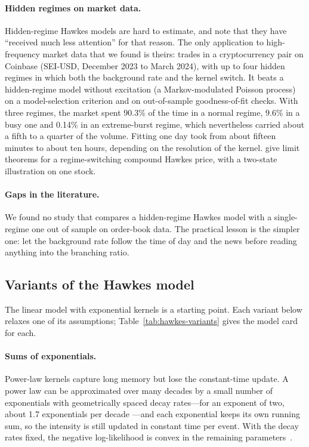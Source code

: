 \paragraph{Hidden regimes on market data.} Hidden-regime Hawkes models are hard to estimate, and
\citet{fabremunitoke2026mmhp} note that they have ``received much less attention'' for that reason. The only application to
high-frequency market data that we found is theirs: trades in a cryptocurrency pair on Coinbase (SEI-USD,
December 2023 to March 2024), with up to four hidden regimes in which both the background rate and the kernel
switch. It beats a hidden-regime model without excitation (a Markov-modulated Poisson process) on a model-selection
criterion and on out-of-sample goodness-of-fit checks. With three regimes, the market spent 90.3\% of the time in a
normal regime, 9.6\% in a busy one and 0.14\% in an extreme-burst regime, which nevertheless carried about a fifth
to a quarter of the volume. Fitting one day took from about fifteen minutes to about ten hours, depending on the
resolution of the kernel. \citet{swishchuk2019chp} give limit theorems for a regime-switching compound Hawkes price,
with a two-state illustration on one stock.

\paragraph{Gaps in the literature.} We found no study that compares a hidden-regime Hawkes model with a single-regime one
out of sample on order-book data. The practical lesson is the simpler one: let the background rate
follow the time of day and the news before reading anything into the branching ratio.

\subsection{Variants of the Hawkes model}
\label{sec:hawkes-variants}

The linear model with exponential kernels is a starting point. Each variant below relaxes one of its
assumptions; Table~\ref{tab:hawkes-variants} gives the model card for each.

\paragraph{Sums of exponentials.} Power-law kernels capture long memory but lose the constant-time
update. A power law can be approximated over many decades by a small number of exponentials with
geometrically spaced decay rates---for an exponent of two, about 1.7 exponentials per decade
\citep{bochud2007}---and each exponential keeps its own running sum, so the intensity is still updated
in constant time per event. With the decay rates fixed, the negative log-likelihood is convex in the remaining
parameters~\citep{wu2019qrhawkes}.

